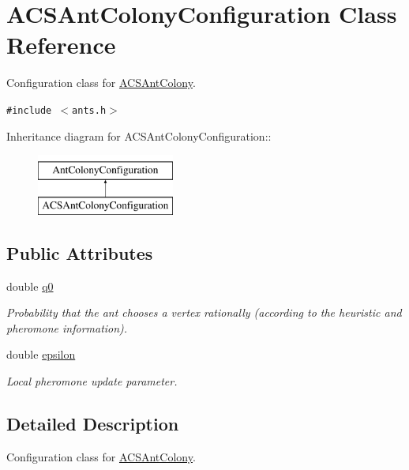 \hypertarget{classACSAntColonyConfiguration}{
\section{ACSAntColonyConfiguration Class Reference}
\label{classACSAntColonyConfiguration}
}
Configuration class for \hyperlink{classACSAntColony}{ACSAntColony}.  


{\tt \#include $<$ants.h$>$}

Inheritance diagram for ACSAntColonyConfiguration::\begin{figure}[H]
\begin{center}
\leavevmode
\includegraphics[height=2cm]{classACSAntColonyConfiguration}
\end{center}
\end{figure}
\subsection*{Public Attributes}
\begin{CompactItemize}
\item 
double \hyperlink{classACSAntColonyConfiguration_237f5ebe10da6ad5b037f207ae9ed939}{q0}
\begin{CompactList}\small\item\em Probability that the ant chooses a vertex rationally (according to the heuristic and pheromone information). \item\end{CompactList}\item 
\hypertarget{classACSAntColonyConfiguration_400bf6805f0d9a82086d4ecbfbb1dfb3}{
double \hyperlink{classACSAntColonyConfiguration_400bf6805f0d9a82086d4ecbfbb1dfb3}{epsilon}}
\label{classACSAntColonyConfiguration_400bf6805f0d9a82086d4ecbfbb1dfb3}

\begin{CompactList}\small\item\em Local pheromone update parameter. \item\end{CompactList}\end{CompactItemize}


\subsection{Detailed Description}
Configuration class for \hyperlink{classACSAntColony}{ACSAntColony}. 

